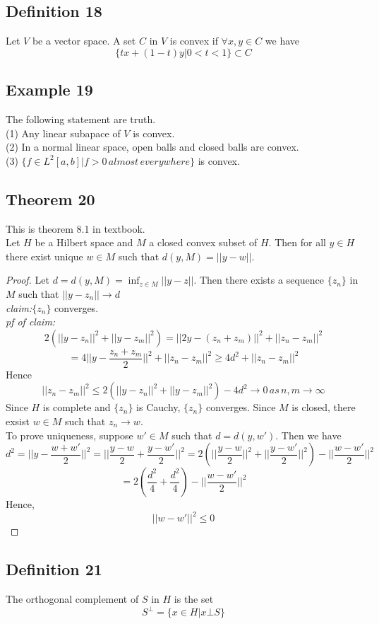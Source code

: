 \documentclass{article}
\begin{document}
\subsection*{Definition 18}
Let $V$ be a vector space. A set $C$ in $V$ is convex if $\forall x,y\in C$ we have
\[
\{tx+(1-t)y|0<t<1\}\subset C
\]

\subsection*{Example 19}
The following statement are truth.\\
(1) Any linear subapace of $V$ is convex.\\
(2) In a normal linear space, open balls and closed balls are convex.\\
(3) $\{f\in L^2[a,b]|f>0\, almost\,everywhere \}$ is convex.\\

\subsection*{Theorem 20}
This is theorem 8.1 in textbook.\\
Let $H$ be a Hilbert space and $M$ a closed convex subset of $H$. Then for all  $y\in H$ there exist unique $w\in M$ such that $d(y,M)=||y-w||$.
\begin{proof}
Let $d=d(y,M)=\inf_{z\in M}{||y-z||}$. Then there exists a sequence $\{z_n\}$ in $M$ such that $||y-z_n||\rightarrow d$\\
\emph{claim:}$\{z_n\}$ converges.\\
\emph{pf of claim:}
\[
2(||y-z_n||^2+||y-z_m||^2)=||2y-(z_n+z_m)||^2+||z_n-z_m||^2
\]
\[
=4||y-\frac{z_n+z_m}{2}||^2+||z_n-z_m||^2\geq 4d^2+||z_n-z_m||^2
\]
Hence
\[
||z_n-z_m||^2\leq2(||y-z_n||^2+||y-z_m||^2)-4d^2\rightarrow 0\, as\, n,m \rightarrow \infty
\]
Since $H$ is complete and $\{z_n\}$ is Cauchy, $\{z_n\}$ converges. Since $M$ is closed, there exsist $w\in M$ such that $z_n\rightarrow w$.\\
To prove uniqueness, suppose $w'\in M$ such that $d=d(y,w')$. Then we have 
\[
d^2=||y-\frac{w+w'}{2}||^2=||\frac{y-w}{2}+\frac{y-w'}{2}||^2=2(||\frac{y-w}{2}||^2+||\frac{y-w'}{2}||^2)-||\frac{w-w'}{2}||^2
\]
\[
=2(\frac{d^2}{4}+\frac{d^2}{4})-||\frac{w-w'}{2}||^2
\]
Hence,
\[
||w-w'||^2\leq 0
\]
\end{proof}

\subsection*{Definition 21}
The orthogonal complement of $S$ in $H$ is the set
\[
S^{\bot}=\{x\in H|x\bot S\}
\]
\end{document}

